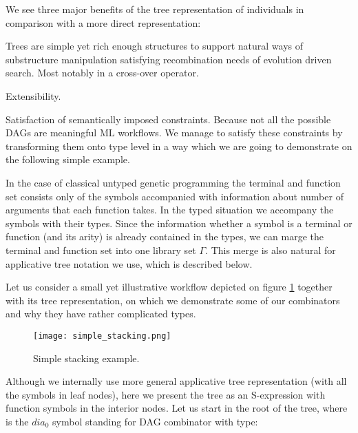 \documentclass{ws-ijait}
\begin{document}
We see three major benefits of the tree representation of individuals in comparison with a more direct representation:
\begin{itemlist}
\item Trees are simple yet rich enough structures to support natural ways of substructure manipulation satisfying recombination needs of evolution driven search. Most notably in a cross-over operator.
\item Extensibility. 
\item Satisfaction of semantically imposed constraints. Because not all the possible DAGs are meaningful ML workflows. We manage to satisfy these constraints by transforming them onto type level in a way which we are going to demonstrate on the following simple example.
\end{itemlist}
In the case of classical untyped genetic programming the terminal and function set consists only of the symbols accompanied with information about number of arguments that each function takes. In the typed situation we accompany the symbols with their types. Since the information whether a symbol is a terminal or function (and its arity) is already contained in the types, we can marge the terminal and function set into one library
set $\Gamma$. This merge is also natural for applicative tree notation we use, which is described below.  

Let us consider a small yet illustrative workflow depicted on figure \ref{simple_stacking} together with its tree representation, on which we demonstrate some of our combinators and why they have rather complicated types.

\begin{figure}[th]
\centerline{\texttt{[image: simple\_stacking.png]}}
\vspace*{8pt}
\caption{Simple stacking example.}
\label{simple_stacking}
\end{figure}

Although we internally use more general applicative tree representation (with all the symbols in leaf nodes),
here we present the tree as an S-expression with function symbols in the interior nodes.
Let us start in the root of the tree, where is the $dia_0$ symbol standing for DAG combinator with type:
 
\end{document}
